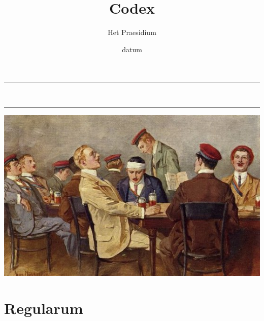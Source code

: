 \documentclass[10pt]{article}
\title{Codex}
\date{{datum}}
\author{Het Praesidium} %
\begin{document}
\begin{titlepage}
\centering
\vspace*{0.5cm}
\hrule
\vspace{0.4cm}
{\LARGE \textsc{\thetitle}}\\[0.4cm]
\vspace{0.4cm}
\hrule
\vspace{15mm}

\includegraphics[scale=0.5]{image.jpg}  %

\vfill
\vspace{1.5cm}
{\Large \thedate}
\vspace{2cm}
\end{titlepage}
\thispagestyle{empty}

\newpage
\vspace{1cm}
\setcounter{secnumdepth}{-1}
\tableofcontents
\renewcommand{\baselinestretch}{1.0}\normalsize
\newpage

\section{Regularum}
\footnotesize

\vspace{1cm}
\end{document}

